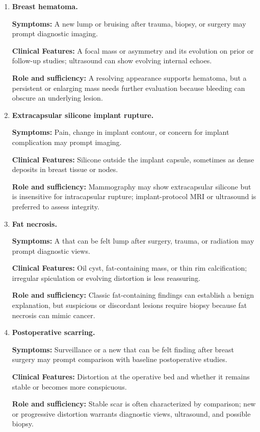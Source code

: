 \begin{enumerate}[leftmargin=*,itemsep=0.45em,topsep=0.4em]
\item \textbf{Breast hematoma.}\par\noindent\textbf{Symptoms:} A new lump or bruising after trauma, biopsy, or surgery may prompt diagnostic imaging.\par\noindent\textbf{Clinical Features:} A focal mass or asymmetry and its evolution on prior or follow-up studies; ultrasound can show evolving internal echoes.\par\noindent\textbf{Role and sufficiency:} A resolving appearance supports hematoma, but a persistent or enlarging mass needs further evaluation because bleeding can obscure an underlying lesion.
\item \textbf{Extracapsular silicone implant rupture.}\par\noindent\textbf{Symptoms:} Pain, change in implant contour, or concern for implant complication may prompt imaging.\par\noindent\textbf{Clinical Features:} Silicone outside the implant capsule, sometimes as dense deposits in breast tissue or nodes.\par\noindent\textbf{Role and sufficiency:} Mammography may show extracapsular silicone but is insensitive for intracapsular rupture; implant-protocol MRI or ultrasound is preferred to assess integrity.
\item \textbf{Fat necrosis.}\par\noindent\textbf{Symptoms:} A that can be felt lump after surgery, trauma, or radiation may prompt diagnostic views.\par\noindent\textbf{Clinical Features:} Oil cyst, fat-containing mass, or thin rim calcification; irregular spiculation or evolving distortion is less reassuring.\par\noindent\textbf{Role and sufficiency:} Classic fat-containing findings can establish a benign explanation, but suspicious or discordant lesions require biopsy because fat necrosis can mimic cancer.
\item \textbf{Postoperative scarring.}\par\noindent\textbf{Symptoms:} Surveillance or a new that can be felt finding after breast surgery may prompt comparison with baseline postoperative studies.\par\noindent\textbf{Clinical Features:} Distortion at the operative bed and whether it remains stable or becomes more conspicuous.\par\noindent\textbf{Role and sufficiency:} Stable scar is often characterized by comparison; new or progressive distortion warrants diagnostic views, ultrasound, and possible biopsy.

\end{enumerate}
